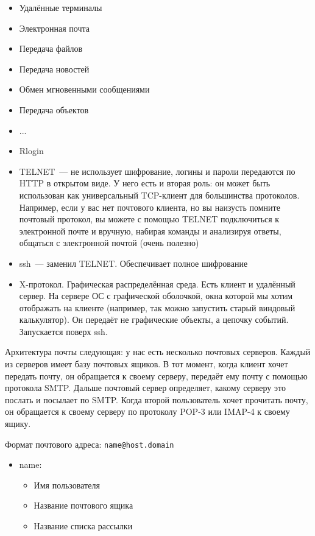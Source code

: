 
\begin{itemize}
    \item Удалённые терминалы
    \item Электронная почта
    \item Передача файлов
    \item Передача новостей
    \item Обмен мгновенными сообщениями
    \item Передача объектов
    \item ...
\end{itemize}


\begin{itemize}
    \item Rlogin
    \item TELNET~--- не использует шифрование, логины и пароли передаются по HTTP в открытом виде. У него есть и вторая роль: он может быть использован как универсальный TCP-клиент для большинства протоколов. Например, если у вас нет почтового клиента, но вы наизусть помните почтовый протокол, вы можете с помощью TELNET подключиться к электронной почте и вручную, набирая команды и анализируя ответы, общаться с электронной почтой (очень полезно)
    \item ssh~--- заменил TELNET. Обеспечивает полное шифрование
    \item X-протокол. Графическая распределённая среда. Есть клиент и удалённый сервер. На сервере ОС с графической оболочкой, окна которой мы хотим отображать на клиенте (например, так можно запустить старый виндовый калькулятор). Он передаёт не графические объекты, а цепочку событий. Запускается поверх ssh.
\end{itemize}


Архитектура почты следующая: у нас есть несколько почтовых серверов. Каждый из серверов имеет базу почтовых ящиков. В тот момент, когда клиент хочет передать почту, он обращается к своему серверу, передаёт ему почту с помощью протокола SMTP. Дальше почтовый сервер определяет, какому серверу это послать и посылает по SMTP. Когда второй пользователь хочет прочитать почту, он обращается к своему серверу по протоколу POP-3 или IMAP-4 к своему ящику.

Формат почтового адреса: {\tt name@host.domain}
\begin{itemize}
    \item name:
    \begin{itemize}
        \item Имя пользователя
        \item Название почтового ящика
        \item Название списка рассылки
    \end{itemize}
\end{itemize}

